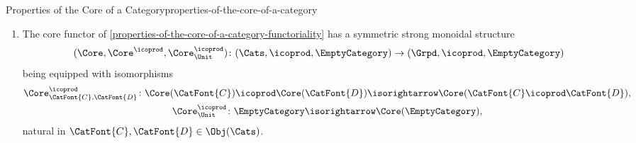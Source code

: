 \begin{proposition}{Properties of the Core of a Category}{properties-of-the-core-of-a-category}
\begin{enumerate}
        \item\label{properties-of-the-core-of-a-category-symmetric-strong-monoidality-with-respect-to-coproducts}The core functor of \cref{properties-of-the-core-of-a-category-functoriality} has a symmetric strong monoidal structure
            \[
                (\Core,\Core^{\icoprod},\Core^{\icoprod}_{\Unit})
                \colon
                (\Cats,\icoprod,\EmptyCategory)
                \to
                (\Grpd,\icoprod,\EmptyCategory)
            \]%
            being equipped with isomorphisms%
            \[
                \begin{gathered}
                    \Core^{\icoprod}_{\CatFont{C},\CatFont{D}} \colon \Core(\CatFont{C})\icoprod\Core(\CatFont{D}) \isorightarrow \Core(\CatFont{C}\icoprod\CatFont{D}),\\
                    \Core^{\icoprod}_{\Unit}                   \colon \EmptyCategory                               \isorightarrow \Core(\EmptyCategory),
                \end{gathered}
            \]%
            natural in $\CatFont{C},\CatFont{D}\in\Obj(\Cats)$.
    \end{enumerate}
\end{proposition}
